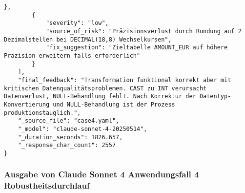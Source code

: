 \begin{lstlisting}[caption={Ausgabe: Claude Sonnet 4 Anwendungsfall 4 Konsistenzdurchlauf},label={claude_case4_prompt2}]
        },
        {
            "severity": "low",
            "source_of_risk": "Präzisionsverlust durch Rundung auf 2 Dezimalstellen bei DECIMAL(18,8) Wechselkursen",
            "fix_suggestion": "Zieltabelle AMOUNT_EUR auf höhere Präzision erweitern falls erforderlich"
        }
    ],
    "final_feedback": "Transformation funktional korrekt aber mit kritischen Datenqualitätsproblemen. CAST zu INT verursacht Datenverlust, NULL-Behandlung fehlt. Nach Korrektur der Datentyp-Konvertierung und NULL-Behandlung ist der Prozess produktionstauglich.",
    "_source_file": "case4.yaml",
    "_model": "claude-sonnet-4-20250514",
    "_duration_seconds": 1826.657,
    "_response_char_count": 2557
}
\end{lstlisting}

\subsubsection{Ausgabe von Claude Sonnet 4 Anwendungsfall 4 Robustheitsdurchlauf}\label{anhang:subsubsec:claude_case4_prompt3}
